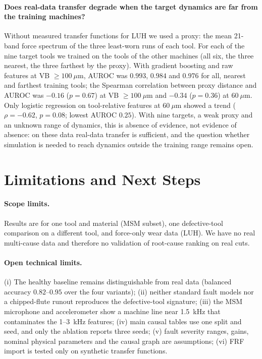 \documentclass[11pt]{article}
\begin{document}
\paragraph{Does real-data transfer degrade when the target dynamics are far from the training machines?} Without measured transfer functions for LUH we used a proxy: the mean 21-band force spectrum of the three least-worn runs of each tool. For each of the nine target tools we trained on the tools of the other machines (all six, the three nearest, the three farthest by the proxy). With gradient boosting and raw features at VB $\ge100~\mu$m, AUROC was $0.993$, $0.984$ and $0.976$ for all, nearest and farthest training tools; the Spearman correlation between proxy distance and AUROC was $-0.16$ ($p=0.67$) at VB $\ge100~\mu$m and $-0.34$ ($p=0.36$) at $60~\mu$m. Only logistic regression on tool-relative features at $60~\mu$m showed a trend ($\rho=-0.62$, $p=0.08$; lowest AUROC $0.25$). With nine targets, a weak proxy and an unknown range of dynamics, this is absence of evidence, not evidence of absence: on these data real-data transfer is sufficient, and the question whether simulation is needed to reach dynamics outside the training range remains open.

\section{Limitations and Next Steps}\label{sec:limits}
\paragraph{Scope limits.} Results are for one tool and material (MSM subset), one defective-tool comparison on a different tool, and force-only wear data (LUH). We have no real multi-cause data and therefore no validation of root-cause ranking on real cuts.
\paragraph{Open technical limits.} (i) The healthy baseline remains distinguishable from real data (balanced accuracy $0.82$--$0.95$ over the four variants); (ii) neither standard fault models nor a chipped-flute runout reproduces the defective-tool signature; (iii) the MSM microphone and accelerometer show a machine line near 1.5~kHz that contaminates the 1--3~kHz features; (iv) main causal tables use one split and seed, and only the ablation reports three seeds; (v) fault severity ranges, gains, nominal physical parameters and the causal graph are assumptions; (vi) FRF import is tested only on synthetic transfer functions.
\end{document}
